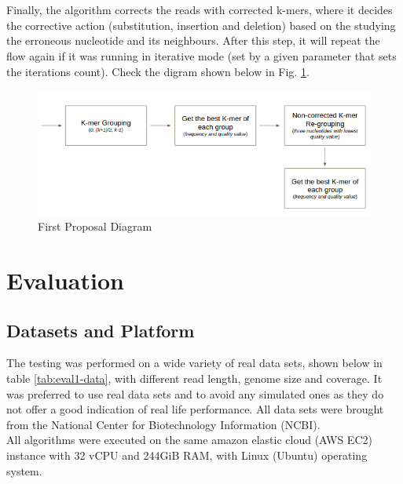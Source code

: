 \documentclass[12pt]{llncs}
\begin{document}
\\
\\
Finally, the algorithm corrects the reads with corrected k-mers, where it decides the corrective action (substitution, insertion and deletion) based on the studying the erroneous nucleotide and its neighbours. After this step, it will repeat the flow again if it was running in iterative mode (set by a given parameter that sets the iterations count).
Check the digram shown below in Fig. \ref{fig:fig-First-Proposal-1}.
\begin{figure}
	\centering
	\includegraphics[width=.911\linewidth]{./figs/First-Proposal-1}
	\caption{\label{fig:fig-First-Proposal-1}First Proposal Diagram}
\end{figure}

\section{Evaluation}
\subsection{Datasets and Platform}
The testing was performed on a wide variety of real data sets, shown below in table \ref{tab:eval1-data}, with different read length, genome size and coverage. It was preferred to use real data sets and to avoid any simulated ones as they do not offer a good indication of real life performance. All data sets were brought from the National Center for Biotechnology Information (NCBI).
\\
All algorithms were executed on the same amazon elastic cloud (AWS EC2) instance with 32 vCPU and 244GiB RAM, with Linux (Ubuntu) operating system.
\end{document}
